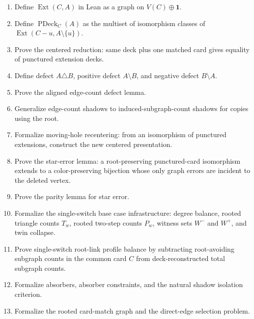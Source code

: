 \documentclass[11pt]{article}
\newcommand{\PDeck}{\operatorname{PDeck}}
\newcommand{\Ext}{\operatorname{Ext}}
\begin{document}
\begin{enumerate}[leftmargin=2em]
  \item Define \(\Ext(C,A)\) in Lean as a graph on \(V(C) \oplus \mathbf{1}\).

  \item Define \(\PDeck_C(A)\) as the multiset of isomorphism classes of
  \(\Ext(C-u,A\setminus\{u\})\).

  \item Prove the centered reduction:
  same deck plus one matched card gives equality of punctured extension decks.

  \item Define defect \(A\triangle B\), positive defect \(A\setminus B\), and
  negative defect \(B\setminus A\).

  \item Prove the aligned edge-count defect lemma.

  \item Generalize edge-count shadows to induced-subgraph-count shadows for
  copies using the root.

  \item Formalize moving-hole recentering: from an isomorphism of punctured
  extensions, construct the new centered presentation.

  \item Prove the star-error lemma: a root-preserving punctured-card
  isomorphism extends to a color-preserving bijection whose only graph errors
  are incident to the deleted vertex.

  \item Prove the parity lemma for star error.

  \item Formalize the single-switch base case infrastructure: degree balance,
  rooted triangle counts \(T_w\), rooted two-step counts \(P_w\), witness sets
  \(W^-\) and \(W^+\), and twin collapse.

  \item Prove single-switch root-link profile balance by subtracting
  root-avoiding subgraph counts in the common card \(C\) from deck-reconstructed
  total subgraph counts.

  \item Formalize absorbers, absorber constraints, and the natural shadow
  isolation criterion.

  \item Formalize the rooted card-match graph and the direct-edge selection
  problem.


\end{enumerate}
\end{document}
